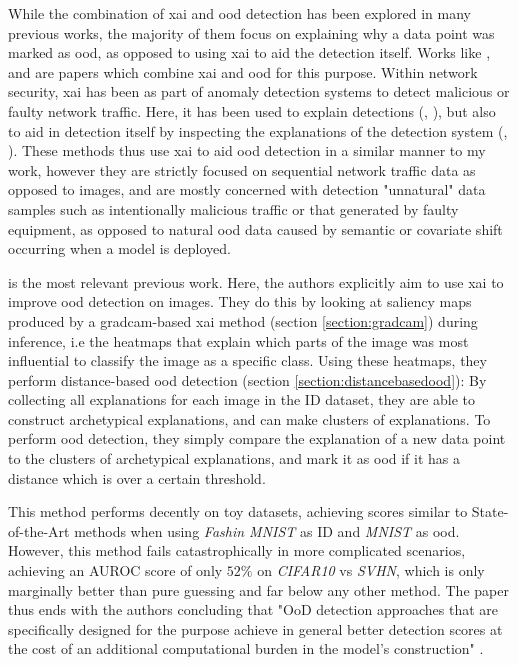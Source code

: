 \documentclass[UKenglish]{uiomasterthesis} %
\theoremstyle{definition}
\begin{document}
While the combination of \ac{xai} and \ac{ood} detection has been explored in many previous works, the majority of them focus on explaining why a data point was marked as \ac{ood}, as opposed to using \ac{xai} to aid the detection itself. Works like \cite{uncertainty}, \cite{generalxaiforood} and \cite{tallon2020explainable} are papers which combine \ac{xai} and \ac{ood} for this purpose. Within network security, \ac{xai} has been as part of anomaly detection systems to detect malicious or faulty network traffic. Here, it has been used to explain detections (\cite{idsxai}, \cite{mahbooba}), but also to aid in detection itself by inspecting the explanations of the detection system (\cite{tcydenova2021detection}, \cite{dnsxai}). These methods thus use \ac{xai} to aid \ac{ood} detection in a similar manner to my work, however they are strictly focused on sequential network traffic data as opposed to images, and are mostly concerned with detection "unnatural" data samples such as intentionally malicious traffic or that generated by faulty equipment, as opposed to natural \ac{ood} data caused by semantic or covariate shift occurring when a model is deployed.

\cite{martinez} is the most relevant previous work. Here, the authors explicitly aim to use \ac{xai} to improve \ac{ood} detection on images. They do this by looking at saliency maps produced by a \ac{gradcam}-based \ac{xai} method (section \ref{section:gradcam}) during inference, i.e the heatmaps that explain which parts of the image was most influential to classify the image as a specific class. Using these heatmaps, they perform distance-based \ac{ood} detection (section \ref{section:distancebasedood}): By collecting all explanations for each image in the ID dataset, they are able to construct archetypical explanations, and can make clusters of explanations. To perform \ac{ood} detection, they simply compare the explanation of a new data point to the clusters of archetypical explanations, and mark it as \ac{ood} if it has a distance which is over a certain threshold.

This method performs decently on toy datasets, achieving scores similar to State-of-the-Art methods when using {\it Fashin MNIST} as ID and {\it MNIST} as \ac{ood}. However, this method fails catastrophically in more complicated scenarios, achieving an AUROC score of only $52\%$ on {\it CIFAR10} vs {\it SVHN}, which is only marginally better than pure guessing and far below any other method. The paper thus ends with the authors concluding that "OoD detection approaches that are specifically designed for the purpose achieve in general better detection scores at the cost of an additional computational burden in the model’s construction" \cite{martinez}.
\end{document}
